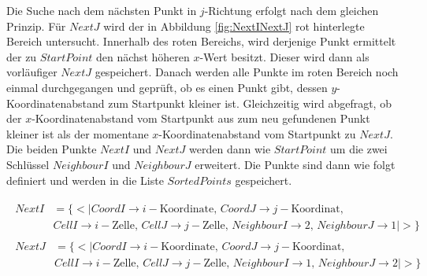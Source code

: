 %


Die Suche nach dem nächsten Punkt in $j$-Richtung erfolgt nach dem gleichen Prinzip. Für $NextJ$ wird der in Abbildung \ref{fig:NextINextJ} rot hinterlegte Bereich untersucht. Innerhalb des roten Bereichs, wird derjenige Punkt ermittelt der zu $StartPoint$ den nächst höheren $x$-Wert besitzt. Dieser wird dann als vorläufiger $NextJ$ gespeichert. Danach werden alle Punkte im roten Bereich noch einmal durchgegangen und geprüft, ob es einen Punkt gibt, dessen $y$-Koordinatenabstand zum Startpunkt kleiner ist. Gleichzeitig wird abgefragt, ob der $x$-Koordinatenabstand vom Startpunkt aus zum neu gefundenen Punkt kleiner ist als der momentane $x$-Koordinatenabstand vom Startpunkt zu $NextJ$. Die beiden Punkte $NextI$ und $NextJ$ werden dann wie $StartPoint$ um die zwei Schlüssel $NeighbourI$ und $NeighbourJ$ erweitert. Die Punkte sind dann wie folgt definiert und werden in die Liste $SortedPoints$ gespeichert. 


\begin{gather*}
	\begin{split}
		NextI &= \{ <|CoordI \rightarrow i-\text{Koordinate},\, CoordJ \rightarrow j-\text{Koordinat},\, \\
		&CellI \rightarrow i-\text{Zelle},\, CellJ \rightarrow j-\text{Zelle},\,
		NeighbourI \rightarrow 2, \,NeighbourJ \rightarrow 1  |>\}
	\end{split}\\
	\begin{split}
	NextJ &= \{ <|CoordI \rightarrow i-\text{Koordinate},\, CoordJ \rightarrow j-\text{Koordinat},\, \\
	&CellI \rightarrow i-\text{Zelle},\, CellJ \rightarrow j-\text{Zelle},\,
	NeighbourI \rightarrow 1, \,NeighbourJ \rightarrow 2 |>\}
\end{split}
\end{gather*}




